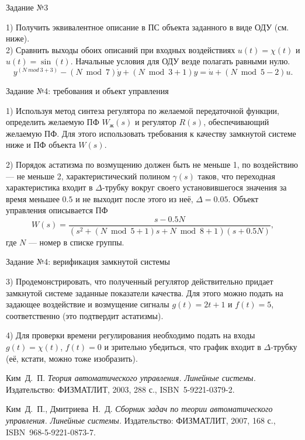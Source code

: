 \documentclass{beamer}
\theoremstyle{plain}
\theoremstyle{definition}
\theoremstyle{remark}
\theoremstyle{plain}
\begin{document}
\begin{frame}{Задание №3}

    1) Получить эквивалентное описание в ПС объекта заданного в виде ОДУ (см. ниже).\\
    2) Сравнить выходы обоих описаний при входных воздействиях 
    $u(t) = \chi(t)$ и $u(t) = \sin(t)$.
    Начальные условия для ОДУ везде полагать равными нулю.
    $$
        y^{(N\ mod\ 3+3)} - (N\bmod 7)\dot y + (N\bmod 3+1)y = \dot u + (N\bmod 5-2)u.
    $$

\end{frame}


\begin{frame}{Задание №4: требования и объект управления}

    1) Используя метод синтеза регулятора по желаемой передаточной функции, определить желаемую ПФ 
    $W_{\text{ж}}(s)$ 
    и регулятор $R(s)$, 
    обеспечивающий
    желаемую ПФ. Для этого использовать требования к качеству замкнутой системе ниже и ПФ объекта 
    $W(s)$.

    \vspace{0.5cm}

    2) Порядок астатизма по возмущению должен быть не меньше 1, по воздействию --- не меньше 2, характеристический полином $\gamma(s)$ таков, что
    переходная характеристика входит в $\Delta$-трубку вокруг своего установившегося значения за время меньшее $0.5$ и не выходит после этого из неё, $\Delta=0.05$.
    Объект управления описывается ПФ
    $$
        W(s)= \frac{s-0.5N}{(s^2+(N\bmod  5 +1)s+ N\bmod  8 +1)(s+0.5N)},
    $$
    где $N$ --- номер в списке группы.
\end{frame}


\begin{frame}{Задание №4: верификация замкнутой системы}

    3) Продемонстрировать, что полученный регулятор действительно придает замкнутой системе заданные показатели качества. Для этого можно
    подать на задающее воздействие и возмущение сигналы 
    $g(t) = 2t+1$ и $f(t) = 5$, 
    соответственно (это подтвердит астатизмы).

    \vspace{0.5cm}

    4) Для проверки времени регулирования необходимо подать на входы 
    $g(t) = \chi(t)$, $f(t) = 0$ 
    и зрительно убедиться, что график входит в 
    $\Delta$-трубку (её, кстати, можно тоже изобразить).

\end{frame}

\begin{thebibliography}{0}

     Ким~Д.~П.
    \emph{Теория автоматического управления. Линейные системы.} Издательство: ФИЗМАТЛИТ, 2003, 288 с., ISBN~5-9221-0379-2.

     Ким~Д.~П., Дмитриева~Н.~Д.
    \emph{Сборник задач по теории автоматического управления. Линейные системы.} Издательство: ФИЗМАТЛИТ, 2007, 168 с., ISBN~968-5-9221-0873-7.


\end{thebibliography}
\end{document}
